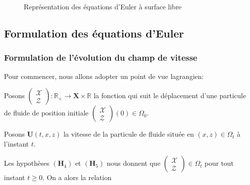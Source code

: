 \documentclass[12pt,a4paper]{article}
\numberwithin{equation}{section}
\begin{document}
\begin{figure}[H]
    \centering
    \caption{Représentation des équations d'Euler à surface libre}
    \label{fig:surface}
\end{figure}

\subsection{Formulation des équations d'Euler}
\subsubsection{Formulation de l'évolution du champ de vitesse}
Pour commencer, nous allons adopter un point de vue lagrangien:
\begin{list}{}{}
    \item[\textbullet] Posons $\left(\begin{array}{l}
         \mathcal{X}\\
         \mathcal{Z}
    \end{array}\right) :  \mathbb{R}_+ \rightarrow \textbf{X}\times\mathbb{R}$ la fonction qui suit le déplacement d'une particule de fluide de position initiale $\left(\begin{array}{l}
         \mathcal{X}\\
         \mathcal{Z}
    \end{array}\right)(0)  \in \Omega_0$.
    \item[\textbullet] Posons $\textbf{U}(t,x,z)$ la vitesse de la particule de fluide située en $(x,z) \in \Omega_t$ à l'instant $t$.
\end{list}
Les hypothèses $(\textbf{H}_4)$ et $(\textbf{H}_5)$ nous donnent que $\left(\begin{array}{l}
         \mathcal{X}\\
         \mathcal{Z}
\end{array}\right)\in \Omega_t$ pour tout instant $t \geq 0$. On a alors la relation
    
\end{document}
